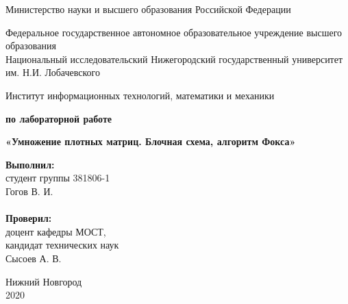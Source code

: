 \documentclass{report}
\begin{document}
\begin{titlepage}

\begin{center}
Министерство науки и высшего образования Российской Федерации
\end{center}

\begin{center}
Федеральное государственное автономное образовательное учреждение высшего образования \\
Национальный исследовательский Нижегородский государственный университет им. Н.И. Лобачевского
\end{center}

\begin{center}
Институт информационных технологий, математики и механики
\end{center}

\vspace{4em}

\begin{center}
\textbf{ по лабораторной работе} \\
\end{center}
\begin{center}
\textbf{\Large«Умножение плотных матриц. Блочная схема, алгоритм Фокса»} \\
\end{center}

\vspace{4em}

\newbox{\lbox}
\newlength{\maxl}
\setlength{\maxl}{\wd\lbox}
\hfill\parbox{7cm}{
\hspace*{5cm}\hspace*{-5cm}\textbf{Выполнил:} \\ студент группы 381806-1 \\ Гогов В. И.\\
\\
\hspace*{5cm}\hspace*{-5cm}\textbf{Проверил:}\\ доцент кафедры МОСТ, \\ кандидат технических наук \\ Сысоев А. В.\\
}
\vspace{\fill}

\begin{center} Нижний Новгород \\ 2020 \end{center}

\end{titlepage}
\end{document}
